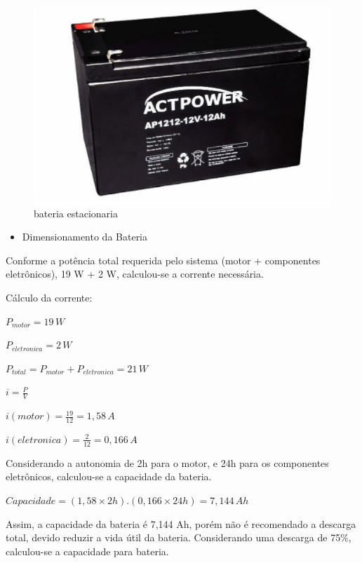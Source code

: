 \begin{figure}[H]
 \centering
   \includegraphics[keepaspectratio=true,scale=0.8]{figuras/motor1.eps}
 \caption{bateria estacionaria}
 \label{motor1}
\end{figure}

\begin{itemize}
\item{Dimensionamento da Bateria}
\end{itemize}

Conforme a potência total requerida pelo sistema (motor + componentes eletrônicos), 19 W + 2 W, calculou-se a corrente necessária.

Cálculo da corrente:

\begin{center}$P_{motor}=19\,W$


$P_{eletronica}=2\,W$


$P_{total}=P_{motor}+P_{eletronica}=21\,W$


$i=\frac{P}{V}$


$i(motor)=\frac{19}{12} = 1,58\,A$


$i(eletronica)=\frac{2}{12} = 0,166\,A$

\end{center}


Considerando a autonomia de 2h para o motor, e 24h para os componentes eletrônicos, calculou-se a capacidade da bateria.

\begin{center}
$Capacidade=(1,58\times2h).(0,166\times24h)=7,144\,Ah$

\end{center}

Assim, a capacidade da bateria é 7,144 Ah, porém não é recomendado a descarga total, devido reduzir a vida útil da bateria. Considerando uma descarga de 75\%, calculou-se a capacidade para bateria.

